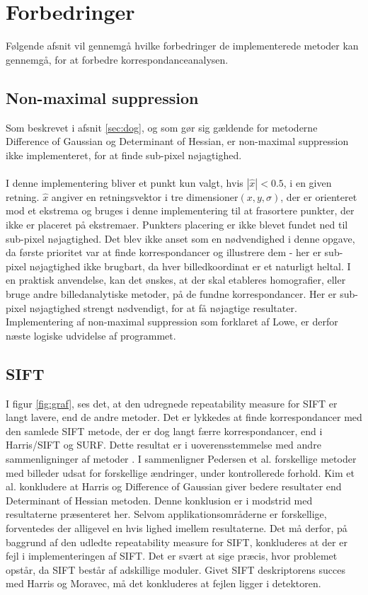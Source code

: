 \section{Forbedringer}
Følgende afsnit vil gennemgå hvilke forbedringer de implementerede metoder kan gennemgå, for at forbedre korrespondanceanalysen.
\subsection{Non-maximal suppression}
Som beskrevet i afsnit \ref{sec:dog}, og som gør sig gældende for metoderne Difference of Gaussian og Determinant of Hessian, er non-maximal suppression ikke implementeret, for at finde sub-pixel nøjagtighed. 
\\
\\
I denne implementering bliver et punkt kun valgt, hvis $|\hat{x}| < 0.5$, i en given retning. $\hat{x}$ angiver en retningsvektor i tre dimensioner$(x, y, \sigma)$, der er orienteret mod et ekstrema og bruges i denne implementering til at frasortere punkter, der ikke er placeret på ekstremaer. Punkters placering er ikke blevet fundet ned til sub-pixel nøjagtighed. Det blev ikke anset som en nødvendighed i denne opgave, da første prioritet var at finde korrespondancer og illustrere dem - her er sub-pixel nøjagtighed ikke brugbart, da hver billedkoordinat er et naturligt heltal. I en praktisk anvendelse, kan det ønskes, at der skal etableres homografier, eller bruge andre billedanalytiske metoder, på de fundne korrespondancer. Her er sub-pixel nøjagtighed strengt nødvendigt, for at få nøjagtige resultater. Implementering af non-maximal suppression som forklaret af Lowe, er derfor næste logiske udvidelse af programmet. 

\subsection{SIFT}
I figur \ref{fig:graf}, ses det, at den udregnede repeatability measure for SIFT er langt lavere, end de andre metoder. Det er lykkedes at finde korrespondancer med den samlede SIFT metode, der er dog langt færre korrespondancer, end i Harris/SIFT og SURF. Dette resultat er i uoverensstemmelse med andre sammenligninger af metoder\cite{kim} \cite{kim2}. I \cite{kim} sammenligner Pedersen et al. forskellige metoder med billeder udsat for forskellige ændringer, under kontrollerede forhold. Kim et al. konkludere at Harris og Difference of Gaussian giver bedere resultater end Determinant of Hessian metoden. Denne konklusion er i modstrid med resultaterne præsenteret her. Selvom applikationsområderne er forskellige, forventedes der alligevel en hvis lighed imellem resultaterne. Det må derfor, på baggrund af den udledte repeatability measure for SIFT, konkluderes at der er fejl i implementeringen af SIFT. Det er svært at sige præcis, hvor problemet opstår, da SIFT består af adskillige moduler. Givet SIFT deskriptorens succes med Harris og Moravec, må det konkluderes at fejlen ligger i detektoren.
